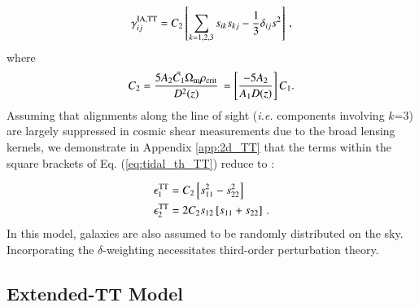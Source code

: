 \begin{eqnarray}
\gamma_{ij}^{\rm IA, TT} = C_2 \left[ \sum_{k=1,2,3} s_{ik} s_{kj} -\frac{1}{3} \delta_{ij} s^2 \right] \, ,
\label{eq:tidal_th_TT}
\end{eqnarray}
where 
\begin{eqnarray}
C_2 = \frac{5 A_2 \bar{C_1} \Omega_{\rm m} \rho_{\rm crit}}{D^2(z)} \,  = \left[ \frac{-5 A_2}{A_1 D(z)} \right] C_1.
\end{eqnarray}
Assuming that alignments along the line of sight ({\it i.e.} components involving $k$=3) are largely suppressed in cosmic shear measurements due to the broad lensing kernels, we demonstrate in Appendix \ref{app:2d_TT} that the terms within the square brackets of Eq. (\ref{eq:tidal_th_TT}) reduce to :

\begin{equation}
\begin{split}
\epsilon_1^{\rm TT} &= C_2  \left[ s_{11}^2 - s_{22}^2\right] \\
 \epsilon_2^{\rm TT} &= 2 C_2 s_{12}\left[s_{11}+s_{22}  \right]\, .
\end{split}
\end{equation}
In this model, galaxies are also assumed to be randomly distributed on the sky. 
Incorporating the $\delta$-weighting necessitates third-order perturbation theory.



\subsection{Extended-TT Model}
\label{subsec:IA_th_extTT}



